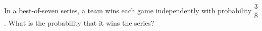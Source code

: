 In a best-of-seven series, a team wins each game independently with probability $\dfrac{3}{8}$. What is the probability that it wins the series?
